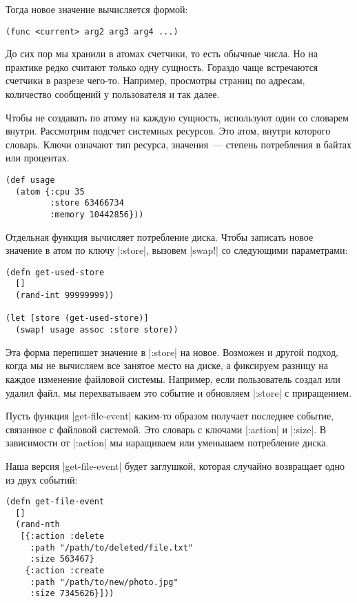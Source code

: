 Тогда новое значение вычисляется формой:

\begin{verbatim}
(func <current> arg2 arg3 arg4 ...)
\end{verbatim}

До сих пор мы хранили в атомах счетчики, то есть обычные числа. Но на практике
редко считают только одну сущность. Гораздо чаще встречаются счетчики в разрезе
чего-то. Например, просмотры страниц по адресам, количество сообщений у
пользователя и так далее.

Чтобы не создавать по атому на каждую сущность, используют один со словарем
внутри. Рассмотрим подсчет системных ресурсов. Это атом, внутри которого
словарь. Ключи означают тип ресурса, значения~--- степень потребления в байтах или
процентах.

\begin{verbatim}
(def usage
  (atom {:cpu 35
         :store 63466734
         :memory 10442856}))
\end{verbatim}

Отдельная функция вычисляет потребление диска. Чтобы записать новое значение в
атом по ключу \spverb|:store|, вызовем \spverb|swap!| со следующими параметрами:

\begin{verbatim}
(defn get-used-store
  []
  (rand-int 99999999))

(let [store (get-used-store)]
  (swap! usage assoc :store store))
\end{verbatim}

Эта форма перепишет значение в \spverb|:store| на новое. Возможен и другой подход,
когда мы не вычисляем все занятое место на диске, а фиксируем разницу на каждое
изменение файловой системы. Например, если пользователь создал или удалил файл,
мы перехватываем это событие и обновляем \spverb|:store| с приращением.

Пусть функция \spverb|get-file-event| каким-то образом получает последнее событие,
связанное с файловой системой. Это словарь с ключами \spverb|:action| и \spverb|:size|. В
зависимости от \spverb|:action| мы наращиваем или уменьшаем потребление диска.

Наша версия \spverb|get-file-event| будет заглушкой, которая случайно возвращает одно
из двух событий:

\begin{verbatim}
(defn get-file-event
  []
  (rand-nth
   [{:action :delete
     :path "/path/to/deleted/file.txt"
     :size 563467}
    {:action :create
     :path "/path/to/new/photo.jpg"
     :size 7345626}]))
\end{verbatim}

